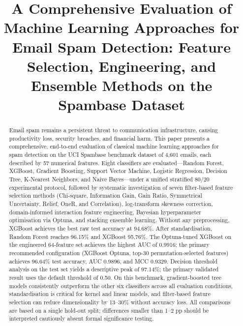 \documentclass[conference]{IEEEtran}
\begin{document}
\title{A Comprehensive Evaluation of Machine Learning Approaches for Email Spam Detection: Feature Selection, Engineering, and Ensemble Methods on the Spambase Dataset}

\author{
}

\maketitle

\begin{abstract}
Email spam remains a persistent threat to communication infrastructure, causing productivity loss, security breaches, and financial harm. This paper presents a comprehensive, end-to-end evaluation of classical machine learning approaches for spam detection on the UCI Spambase benchmark dataset of 4,601 emails, each described by 57 numerical features. Eight classifiers are evaluated---Random Forest, XGBoost, Gradient Boosting, Support Vector Machine, Logistic Regression, Decision Tree, K-Nearest Neighbors, and Naive Bayes---under a unified stratified 80/20 experimental protocol, followed by systematic investigation of seven filter-based feature selection methods (Chi-square, Information Gain, Gain Ratio, Symmetrical Uncertainty, Relief, OneR, and Correlation), log-transform skewness correction, domain-informed interaction feature engineering, Bayesian hyperparameter optimisation via Optuna, and stacking ensemble learning. Without any preprocessing, XGBoost achieves the best raw test accuracy at 94.68\%. After standardisation, Random Forest reaches 96.15\% and XGBoost 95.76\%. The Optuna-tuned XGBoost on the engineered 64-feature set achieves the highest AUC of 0.9916; the primary recommended configuration (XGBoost Optuna, top-30 permutation-selected features) achieves 96.64\% test accuracy, AUC 0.9896, and MCC 0.9329. Decision threshold analysis on the test set yields a descriptive peak of 97.14\%; the primary validated result uses the default threshold of 0.50. On this benchmark, gradient-boosted tree models consistently outperform the other six classifiers across all evaluation conditions, standardisation is critical for kernel and linear models, and filter-based feature selection can reduce dimensionality by 13--30\% without accuracy loss. All comparisons are based on a single hold-out split; differences smaller than 1--2 pp should be interpreted cautiously absent formal significance testing.
\end{abstract}
\end{document}
